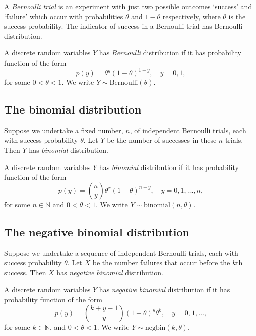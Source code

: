 \documentclass[]{book}
\theoremstyle{definition}
\theoremstyle{definition}
\theoremstyle{definition}
\theoremstyle{remark}
\let\BeginKnitrBlock\begin \let\EndKnitrBlock\end
\begin{document}
A \emph{Bernoulli trial} is an experiment with just two possible
outcomes `success' and `failure' which occur with probabilities
\(\theta\) and \(1- \theta\) respectively, where \(\theta\) is the
success probability. The indicator of success in a Bernoulli trial has
Bernoulli distribution.

\BeginKnitrBlock{definition}
\protect\hypertarget{def:unnamed-chunk-1}{}{\label{def:unnamed-chunk-1} }A
discrete random variables \(Y\) has \emph{Bernoulli} distribution if it
has probability function of the form
\[p(y) = \theta^y (1- \theta)^{1-y}, \quad y = 0, 1,\] for some
\(0 < \theta < 1\). We write \(Y \sim \text{Bernoulli}(\theta)\).
\EndKnitrBlock{definition}

\subsection{The binomial distribution}\label{the-binomial-distribution}

Suppose we undertake a fixed number, \(n\), of independent Bernoulli
trials, each with success probability \(\theta\). Let \(Y\) be the
number of successes in these \(n\) trials. Then \(Y\) has
\emph{binomial} distribution.

\BeginKnitrBlock{definition}
\protect\hypertarget{def:unnamed-chunk-2}{}{\label{def:unnamed-chunk-2} }A
discrete random variables \(Y\) has \emph{binomial} distribution if it
has probability function of the form
\[p(y) = \binom{n}{y} \theta^x (1 - \theta)^{n-y}, \quad y = 0, 1, \ldots, n,\]
for some \(n \in \mathbb{N}\) and \(0 < \theta < 1\). We write
\(Y \sim \text{binomial}(n, \theta)\).
\EndKnitrBlock{definition}

\subsection{The negative binomial
distribution}\label{the-negative-binomial-distribution}

Suppose we undertake a sequence of independent Bernoulli trials, each
with success probability \(\theta\). Let \(X\) be the number failures
that occur before the \(k\)th success. Then \(X\) has \emph{negative
binomial} distribution. \BeginKnitrBlock{definition}

\protect\hypertarget{def:unnamed-chunk-3}{}{\label{def:unnamed-chunk-3} }A
discrete random variables \(Y\) has \emph{negative binomial}
distribution if it has probability function of the form
\[p(y) = \binom{k + y - 1}{y} (1 - \theta)^y \theta^k, \quad
  y = 0, 1, \ldots,
\] for some \(k \in \mathbb{N}\), and \(0 < \theta < 1\). We write
\(Y \sim \text{negbin}(k, \theta)\).
\EndKnitrBlock{definition}
\end{document}
